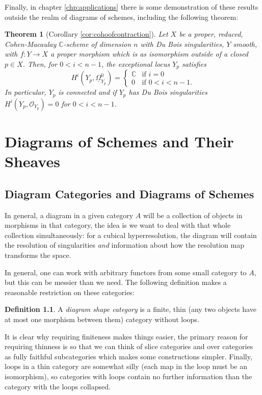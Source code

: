 \documentclass{report}
\newtheorem{theorem}{Theorem}[section]
\theoremstyle{definition}
\newtheorem{definition}[theorem]{Definition}
\newcommand{\CC}{\mathbb{C}}
\newcommand{\OO}{\mathcal{O}}
\newcommand{\DB}{\underline{\Omega}}
\begin{document}
Finally, in chapter \ref{chp:applications} there is some demonstration of these results outside the realm of diagrams of schemes, including the following theorem:
\begin{theorem}[Corollary \ref{cor:cohoofcontraction}]
	Let $X$ be a proper, reduced, Cohen-Macaulay $\CC$-scheme of dimension $n$ with Du Bois singularities, $Y$ smooth, with $f : Y \rightarrow X$ a proper morphism which is as isomorphism outside of a closed $p \in X$.
	Then, for $0 < i < n - 1$, the exceptional locus $Y_p$ satisfies
	\[
	H^i (Y_p, \DB_{Y_p}^0) = \begin{cases}
	\CC & \text{if } i = 0 \\
	0 & \text{if } 0 < i < n - 1.
	\end{cases}
	\]
	In particular, $Y_p$ is connected and if $Y_p$ has Du Bois singularities $H^i(Y_p, \OO_{Y_p}) = 0$ for $0 < i < n - 1$.
\end{theorem}



\chapter{Diagrams of Schemes and Their Sheaves}
\label{chp:diagrams}
\section{Diagram Categories and Diagrams of Schemes}
In general, a diagram in a given category $A$ will be a collection of objects in morphisms in that category, the idea is we want to deal with that whole collection simultaneously: for a cubical hyperresolution, the diagram will contain the resolution of singularities \textit{and} information about how the resolution map transforms the space.

In general, one can work with arbitrary functors from some small category to $A$, but this can be messier than we need.
The following definition makes a reasonable restriction on these categories:
\begin{definition}
	A \textit{diagram shape category} is a finite, thin (any two objects have at most one morphism between them) category without loops.
\end{definition}

It is clear why requiring finiteness makes things easier, the primary reason for requiring thinness is so that we can think of slice categories and over categories as fully faithful subcategories which makes some constructions simpler.
Finally, loops in a thin category are somewhat silly (each map in the loop must be an isomorphism), so categories with loops contain no further information than the category with the loops collapsed.
\end{document}
